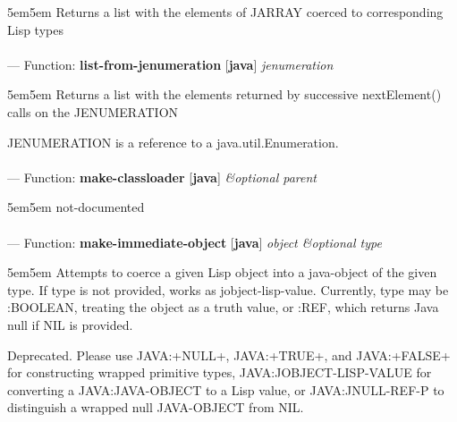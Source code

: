 \begin{adjustwidth}{5em}{5em}
Returns a list with the elements of JARRAY coerced to corresponding Lisp types
\end{adjustwidth}

\paragraph{}
\label{JAVA:LIST-FROM-JENUMERATION}
--- Function: \textbf{list-from-jenumeration} [\textbf{java}] \textit{jenumeration}

\begin{adjustwidth}{5em}{5em}
Returns a list with the elements returned by successive nextElement() calls on the JENUMERATION

JENUMERATION is a reference to a java.util.Enumeration.
\end{adjustwidth}

\paragraph{}
\label{JAVA:MAKE-CLASSLOADER}
--- Function: \textbf{make-classloader} [\textbf{java}] \textit{\&optional parent}

\begin{adjustwidth}{5em}{5em}
not-documented
\end{adjustwidth}

\paragraph{}
\label{JAVA:MAKE-IMMEDIATE-OBJECT}
--- Function: \textbf{make-immediate-object} [\textbf{java}] \textit{object \&optional type}

\begin{adjustwidth}{5em}{5em}
Attempts to coerce a given Lisp object into a java-object of the
given type.  If type is not provided, works as jobject-lisp-value.
Currently, type may be :BOOLEAN, treating the object as a truth value,
or :REF, which returns Java null if NIL is provided.

Deprecated.  Please use JAVA:+NULL+, JAVA:+TRUE+, and JAVA:+FALSE+ for
constructing wrapped primitive types, JAVA:JOBJECT-LISP-VALUE for converting a
JAVA:JAVA-OBJECT to a Lisp value, or JAVA:JNULL-REF-P to distinguish a wrapped
null JAVA-OBJECT from NIL.
\end{adjustwidth}

